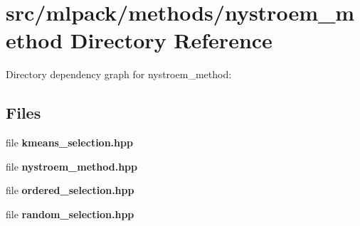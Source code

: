 \section{src/mlpack/methods/nystroem\-\_\-method Directory Reference}
\label{dir_f838e2f36db604327e1b791d256d57c8}
Directory dependency graph for nystroem\-\_\-method\-:
\subsection*{Files}
\begin{DoxyCompactItemize}
\item 
file {\bf kmeans\-\_\-selection.\-hpp}
\item 
file {\bf nystroem\-\_\-method.\-hpp}
\item 
file {\bf ordered\-\_\-selection.\-hpp}
\item 
file {\bf random\-\_\-selection.\-hpp}
\end{DoxyCompactItemize}
